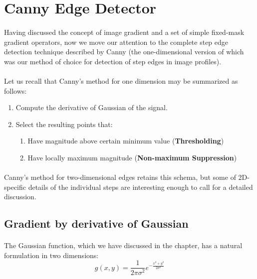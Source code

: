 \section{Canny Edge Detector}

\paragraph*{}
Having discussed the concept of image gradient and a set of simple fixed-mask gradient operators, now we move our attention to the complete step edge detection technique described\cite{Canny86} by Canny (the one-dimensional version of which was our method of choice for detection of step edges in image profiles). 

\paragraph*{}
Let us recall that Canny's method for one dimension may be summarized as follows:
\begin{enumerate}
	\item Compute the derivative of Gaussian of the signal.
	\item Select the resulting points that:
	\begin{enumerate}
		\item Have magnitude above certain minimum value (\textbf{Thresholding})
		\item Have locally maximum magnitude (\textbf{Non-maximum Suppression})
	\end{enumerate}
\end{enumerate}

\paragraph*{}
Canny's method for two-dimensional edges retains this schema, but some of 2D-specific details of the individual steps are interesting enough to call for a detailed discussion.

\subsection{Gradient by derivative of Gaussian}

\paragraph*{}
The Gaussian function, which we have discussed in the  chapter, has a natural formulation in two dimensions:
\[
    g(x,y)= \frac{1}{2\pi \sigma^2} e^{-\frac{x^2+y^2}{2 \sigma^2}}
\]

